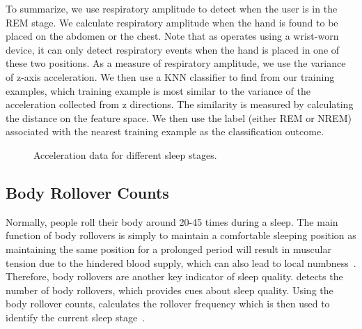  To summarize, we use respiratory amplitude to detect when the user is in the REM stage.  We calculate respiratory
amplitude when the hand is found to be placed on the abdomen or the chest. {Note that as {\systemname} operates using a wrist-worn device,
it can only detect respiratory events when the hand is placed in one of these two positions. As a measure of respiratory amplitude, we use}
the variance of z-axis acceleration. We then use a KNN classifier to find from our training examples, which training example is most
similar to the variance of the acceleration collected from z directions. The similarity is measured by calculating the distance on the
feature space. We then use the label (either REM or NREM) associated with the nearest training example as the classification outcome.

\begin{figure}[!t]
	\centering
	\caption{Acceleration data for different sleep stages.}\label{fig:cordi}
\end{figure}

\subsection{Body Rollover Counts\label{sec:bodyrollover}}

Normally, people roll their body around 20-45 times during a sleep. The main function of body rollovers is simply to maintain a comfortable
sleeping position as maintaining the same position for a prolonged period will result in muscular tension due to the hindered blood supply,
which can also lead to local numbness~\cite{rollover2014}. Therefore, body rollovers are another key indicator of sleep quality.
{{\systemname} detects the number of body rollovers, which provides cues about sleep quality. Using the body rollover counts, \systemname
calculates the rollover frequency which is then used to identify the current sleep stage~\cite{rollover2007}}.

